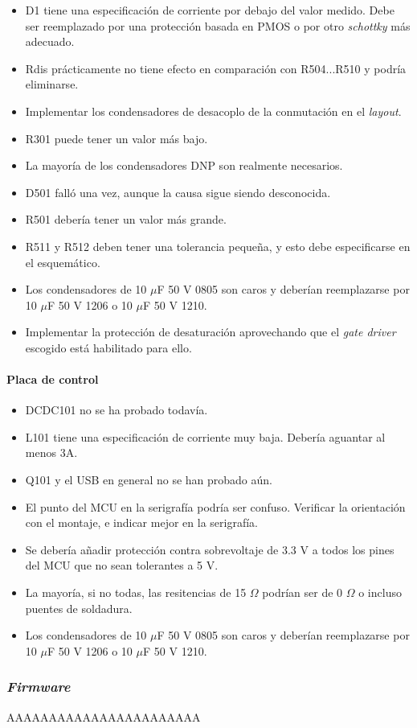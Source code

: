 \begin{itemize}
	\item D1 tiene una especificación de corriente por debajo del valor medido. Debe ser reemplazado por una protección basada en PMOS o por otro \textit{schottky} más adecuado.
	\item Rdis prácticamente no tiene efecto en comparación con R504...R510 y podría eliminarse.
	\item Implementar los condensadores de desacoplo de la conmutación en el \textit{layout}.
	\item R301 puede tener un valor más bajo.
	\item La mayoría de los condensadores DNP son realmente necesarios.
	\item D501 falló una vez, aunque la causa sigue siendo desconocida.
	\item R501 debería tener un valor más grande.
	\item R511 y R512 deben tener una tolerancia pequeña, y esto debe especificarse en el esquemático.
	\item Los condensadores de 10 $\mu$F 50 V 0805 son caros y deberían reemplazarse por 10 $\mu$F 50 V 1206 o 10 $\mu$F 50 V 1210.
	\item Implementar la protección de desaturación aprovechando que el \textit{gate driver} escogido está habilitado para ello.
\end{itemize}

\paragraph{Placa de control}

\begin{itemize}
	\item DCDC101 no se ha probado todavía.
	\item L101 tiene una especificación de corriente muy baja. Debería aguantar al menos 3A.
	\item Q101 y el USB en general no se han probado aún.
	\item El punto del MCU en la serigrafía podría ser confuso. Verificar la orientación con el montaje, e indicar mejor en la serigrafía.
	\item Se debería añadir protección contra sobrevoltaje de 3.3 V a todos los pines del MCU que no sean tolerantes a 5 V.
	\item La mayoría, si no todas, las resitencias de 15 $\Omega$ podrían ser de 0 $\Omega$ o incluso puentes de soldadura.
	\item Los condensadores de 10 $\mu$F 50 V 0805 son caros y deberían reemplazarse por 10 $\mu$F 50 V 1206 o 10 $\mu$F 50 V 1210.
\end{itemize}

\subsubsection{\textit{Firmware}}
AAAAAAAAAAAAAAAAAAAAAAA